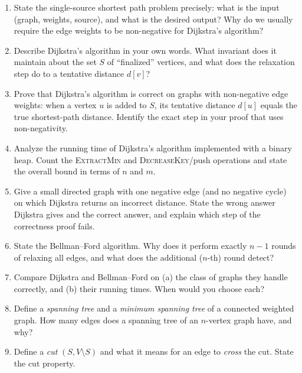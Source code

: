 \documentclass[11pt]{article}
\begin{document}
\begin{enumerate}[label=\textbf{A\arabic*.}, leftmargin=2.2em]

\item State the single-source shortest path problem precisely: what is the input
(graph, weights, source), and what is the desired output? Why do we usually
require the edge weights to be non-negative for Dijkstra's algorithm?

\item Describe Dijkstra's algorithm in your own words. What invariant does it
maintain about the set $S$ of ``finalized'' vertices, and what does the relaxation
step do to a tentative distance $d[v]$?

\item Prove that Dijkstra's algorithm is correct on graphs with non-negative
edge weights: when a vertex $u$ is added to $S$, its tentative distance $d[u]$
equals the true shortest-path distance. Identify the exact step in your proof
that uses non-negativity.

\item Analyze the running time of Dijkstra's algorithm implemented with a binary
heap. Count the \textsc{ExtractMin} and \textsc{DecreaseKey}/push operations and
state the overall bound in terms of $n$ and $m$.

\item Give a small directed graph with one negative edge (and no negative cycle)
on which Dijkstra returns an incorrect distance. State the wrong answer Dijkstra
gives and the correct answer, and explain which step of the correctness proof
fails.

\item State the Bellman--Ford algorithm. Why does it perform exactly $n-1$ rounds
of relaxing all edges, and what does the additional ($n$-th) round detect?

\item Compare Dijkstra and Bellman--Ford on (a) the class of graphs they handle
correctly, and (b) their running times. When would you choose each?

\item Define a \emph{spanning tree} and a \emph{minimum spanning tree} of a
connected weighted graph. How many edges does a spanning tree of an $n$-vertex
graph have, and why?

\item Define a \emph{cut} $(S, V \setminus S)$ and what it means for an edge to
\emph{cross} the cut. State the cut property.


\end{enumerate}
\end{document}
